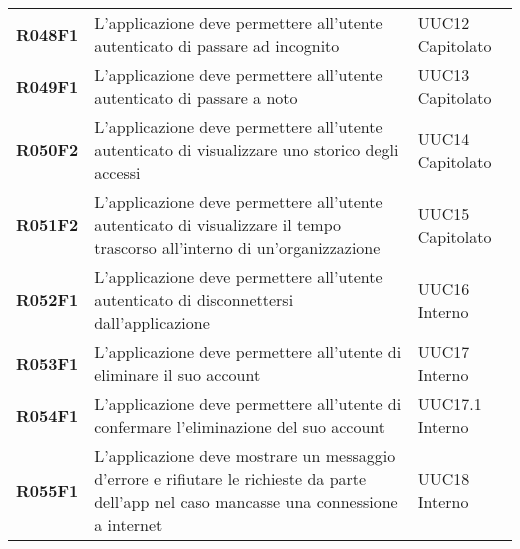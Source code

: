 \documentclass[../analisi-dei-requisiti.tex]{subfiles}
\begin{document}
\begin{longtable}[H]{>{\centering\bfseries}m{3cm} >{\centering}m{10cm} >{\centering\arraybackslash}m{3cm}}
  R048F1                               & L'applicazione deve permettere all'utente autenticato di passare ad incognito                                                                                                                           & UUC12 Capitolato              \\
  R049F1                               & L'applicazione deve permettere all'utente autenticato di passare a noto                                                                                                                                 & UUC13 Capitolato              \\
  R050F2                               & L'applicazione deve permettere all'utente autenticato di visualizzare uno storico degli accessi                                                                                                         & UUC14 Capitolato              \\
  R051F2                               & L'applicazione deve permettere all'utente autenticato di visualizzare il tempo trascorso all'interno di un'organizzazione                                                                               & UUC15 Capitolato              \\
  R052F1                               & L'applicazione deve permettere all'utente autenticato di disconnettersi dall'applicazione                                                                                                               & UUC16 Interno                 \\
  R053F1                               & L'applicazione deve permettere all'utente di eliminare il suo account                                                                                                                                   & UUC17 Interno                 \\
  R054F1                               & L'applicazione deve permettere all'utente di confermare l'eliminazione del suo account                                                                                                                  & UUC17.1 Interno               \\
  R055F1                               & L'applicazione deve mostrare un messaggio d'errore e rifiutare le richieste da parte dell'app nel caso mancasse una connessione a internet                                                              & UUC18 Interno                 \\


\end{longtable}
\end{document}
